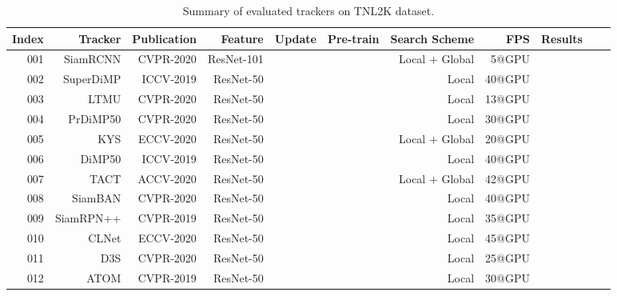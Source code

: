 \documentclass[final]{cvpr}
\begin{document}
\begin{table*}[!htp]
\center
\scriptsize  
\caption{Summary of evaluated trackers on TNL2K dataset.}  
\label{SummaryTrackers}  
\begin{tabular}{rrrrccrrccc} 		\hline \toprule [0.8 pt] 
\textbf{Index} 		&\textbf{Tracker}  	&\textbf{Publication}  &\textbf{Feature}      		&\textbf{Update}			&\textbf{Pre-train}				&\textbf{Search Scheme} 		&\textbf{FPS} 		 &\textbf{Results}    \\
\hline 
001			&SiamRCNN	 \cite{voigtlaender2020siamRCNN}		&CVPR-2020    	&ResNet-101     	&\xmark    		 	&\cmark    	&Local + Global	&5@GPU    		&\\
002			&SuperDiMP    \cite{bhat2019DiMP}							&ICCV-2019    	&ResNet-50     	&\cmark     			&\cmark    	&Local    		 		&40@GPU    	&		 	\\
003			&LTMU 			 \cite{dai2020ltmu}								&CVPR-2020    	&ResNet-50     	&\cmark     			&\cmark    	&Local    		 		&13@GPU    	&		 	\\
004			&PrDiMP50 	 \cite{danelljan2020PRDiMP}				&CVPR-2020    	&ResNet-50     	&\cmark     			&\cmark    	&Local    		 		&30@GPU    	&		 	\\
005			&KYS			 	 \cite{Goutam2020KYS}						&ECCV-2020    	&ResNet-50     	&\cmark     			&\cmark    	&Local + Global  &20@GPU    	&		 	\\
006			&DiMP50	 		 \cite{bhat2019DiMP}							&ICCV-2019    	&ResNet-50     	&\cmark     			&\cmark    	&Local    		 		&40@GPU    	&		 	\\
007			&TACT		 	 \cite{choi2020TACT}							&ACCV-2020    	&ResNet-50     	&\xmark    			&\cmark    	&Local + Global  &42@GPU    	&		 	\\
008			&SiamBAN		 \cite{chen2020siamban}						&CVPR-2020    	&ResNet-50     	&\xmark     			&\cmark    	&Local    		 		&40@GPU    	&		 	\\
009			&SiamRPN++	 \cite{li2018siamrpn++}						&CVPR-2019    	&ResNet-50     	&\xmark     			&\cmark    	&Local    		 		&35@GPU    	&		 	\\
010			&CLNet		 	 \cite{dong2020clnet}							&ECCV-2020    	&ResNet-50     	&\xmark     			&\cmark    	&Local    		 		&45@GPU    	&		 	\\
011			&D3S			 	 \cite{lukezic2020d3s}							&CVPR-2020    	&ResNet-50     	&\xmark     			&\cmark    	&Local    		 		&25@GPU    	&		 	\\
012			&ATOM		 	 \cite{danelljan2019atom}					&CVPR-2019    	&ResNet-50     	&\xmark     			&\cmark    	&Local    		 		&30@GPU    	&		 	\\

\end{tabular}
\end{table*}
\end{document}
